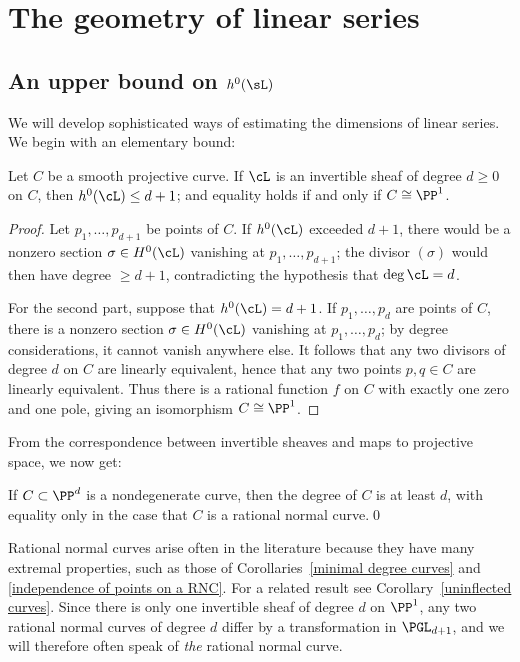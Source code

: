\section{The geometry of linear series}

\subsection*{An upper bound on $h^0(\sL)$}

We will develop sophisticated ways of estimating the dimensions of linear series. We begin with an elementary bound:

\begin{theorem}\label{characterization of P1}
Let $C$ be a smooth projective curve. If $\cL$ is an invertible sheaf of degree $d\geq 0$ on $C$, then $h^0(\cL)\leq d+1$; and
equality holds if and only if $C \cong \PP^1$.
\end{theorem}

\begin{proof}
Let $p_1,\dots,p_{d+1}$ be 
points of $C$. If $h^0(\cL)$
exceeded $d+1$,
there would be a nonzero section
$\sigma \in H^0(\cL)$ vanishing at $p_1,\dots,p_{d+1}$; the divisor
$(\sigma)$ would then have degree $\geq d+1$, contradicting the
hypothesis that $\deg \cL = d$.

For the second part, suppose that $h^0(\cL) = d+1$. If
$p_1,\dots,p_{d}$ are points of $C$, there is a nonzero section
$\sigma \in H^0(\cL)$ vanishing at $p_1,\dots,p_{d}$; by degree
considerations, it cannot vanish anywhere else. It follows that any
two divisors of degree $d$ on $C$ are linearly equivalent, hence that
any two points $p,q \in C$ are linearly equivalent. Thus there is a
rational function $f$ on $C$ with exactly one zero and one pole,
giving an isomorphism $C \cong \PP^1$. 
 \end{proof}

From the correspondence between invertible sheaves and maps to projective space, we now get:
\begin{corollary}\label{minimal degree curves}
If $C\subset \PP^d$ is a  nondegenerate curve, then
the degree of $C$ 
is at least $d$,
with equality only in the case
that $C$ is a rational normal curve.\qed
\end{corollary}

Rational normal curves arise often in the literature because they have many extremal properties, such as those of Corollaries~\ref{minimal degree curves} and \ref{independence of points on a RNC}. For a related result see Corollary~\ref{uninflected curves}. Since there is only
one invertible sheaf of degree $d$ on $\PP^1$,
any two rational normal curves of degree $d$ differ by a transformation in $\PGL_{d+1}$,
and we will therefore often speak of \emph{the} 
rational normal curve.
%

